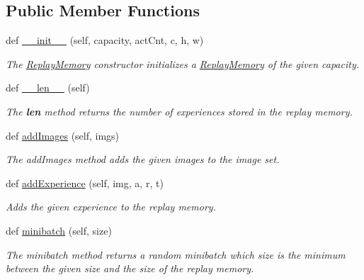 \subsection*{Public Member Functions}
\begin{DoxyCompactItemize}
\item 
def \hyperlink{classDQN-Deepmind-NIPS-2013_1_1agent_1_1DeepMindAgent_1_1ReplayMemory_a8b43f49e7cc41952febfe6bdf7003a83}{\+\_\+\+\_\+init\+\_\+\+\_\+} (self, capacity, act\+Cnt, c, h, w)
\begin{DoxyCompactList}\small\item\em The \hyperlink{classDQN-Deepmind-NIPS-2013_1_1agent_1_1DeepMindAgent_1_1ReplayMemory}{Replay\+Memory} constructor initializes a \hyperlink{classDQN-Deepmind-NIPS-2013_1_1agent_1_1DeepMindAgent_1_1ReplayMemory}{Replay\+Memory} of the given capacity. \end{DoxyCompactList}\item 
def \hyperlink{classDQN-Deepmind-NIPS-2013_1_1agent_1_1DeepMindAgent_1_1ReplayMemory_aef90d1c859c72ea6de32ed97cf0f4a7c}{\+\_\+\+\_\+len\+\_\+\+\_\+} (self)
\begin{DoxyCompactList}\small\item\em The {\bfseries len} method returns the number of experiences stored in the replay memory. \end{DoxyCompactList}\item 
def \hyperlink{classDQN-Deepmind-NIPS-2013_1_1agent_1_1DeepMindAgent_1_1ReplayMemory_ab920b49aedb6569d214cf0e6fd390cea}{add\+Images} (self, imgs)
\begin{DoxyCompactList}\small\item\em The add\+Images method adds the given images to the image set. \end{DoxyCompactList}\item 
def \hyperlink{classDQN-Deepmind-NIPS-2013_1_1agent_1_1DeepMindAgent_1_1ReplayMemory_ab43dd0161bc7e1dc749a6188062880fa}{add\+Experience} (self, img, a, r, t)
\begin{DoxyCompactList}\small\item\em Adds the given experience to the replay memory. \end{DoxyCompactList}\item 
def \hyperlink{classDQN-Deepmind-NIPS-2013_1_1agent_1_1DeepMindAgent_1_1ReplayMemory_a345939d730803f20978861c2ba6cd397}{minibatch} (self, size)
\begin{DoxyCompactList}\small\item\em The minibatch method returns a random minibatch which size is the minimum between the given size and the size of the replay memory. \end{DoxyCompactList}\end{DoxyCompactItemize}



